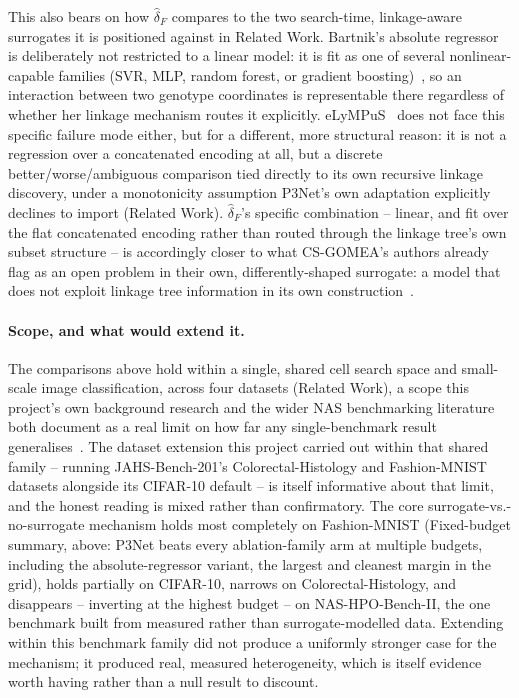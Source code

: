 This also bears on how $\hat{\delta}_F$ compares to the two search-time, linkage-aware surrogates it is
positioned against in Related Work. Bartnik's absolute regressor is deliberately not restricted to a linear
model: it is fit as one of several nonlinear-capable families (SVR, MLP, random forest, or gradient
boosting)~\citep{bartnik2026evolutionary}, so an interaction between two genotype coordinates is
representable there regardless of whether her linkage mechanism routes it explicitly. eLyMPuS~\citep{przewozniczek2026lympus} does not face
this specific failure mode either, but for a different, more structural reason: it is not a regression over
a concatenated encoding at all, but a discrete better/worse/ambiguous comparison tied directly to its own
recursive linkage discovery, under a monotonicity assumption P3Net's own adaptation explicitly declines to
import (Related Work). $\hat{\delta}_F$'s specific combination -- linear, and
fit over the flat concatenated encoding rather than routed through the linkage tree's own subset structure
-- is accordingly closer to what CS-GOMEA's authors already flag as an open problem in their own,
differently-shaped surrogate: a model that does not exploit linkage tree information in its own
construction~\citep{dushatskiy2019csgomea}.

\paragraph{Scope, and what would extend it.} The comparisons above hold within a single, shared cell search
space and small-scale image classification, across four datasets (Related Work), a scope this project's own
background research and the wider NAS benchmarking literature both document as a real limit on how far any
single-benchmark result generalises~\citep{yang2020nasfrustratinglyhard,mehta2022nasbenchsuite,
lopes2023nasbenchdesign,tu2022nasbench360,duan2021transnasbench101}. The dataset extension this project
carried out within that shared family -- running JAHS-Bench-201's Colorectal-Histology and Fashion-MNIST
datasets alongside its CIFAR-10 default -- is itself informative about that limit, and the honest reading is
mixed rather than confirmatory. The core surrogate-vs.-no-surrogate mechanism holds most completely on
Fashion-MNIST (Fixed-budget summary, above: P3Net beats every ablation-family arm at multiple budgets,
including the absolute-regressor variant, the largest and cleanest margin in the grid), holds partially on
CIFAR-10, narrows on Colorectal-Histology, and disappears -- inverting at the highest budget -- on
NAS-HPO-Bench-II, the one benchmark built from measured rather than surrogate-modelled data. Extending
within this benchmark family did not produce a uniformly stronger case for the mechanism; it produced real,
measured heterogeneity, which is itself evidence worth having rather than a null result to discount.

